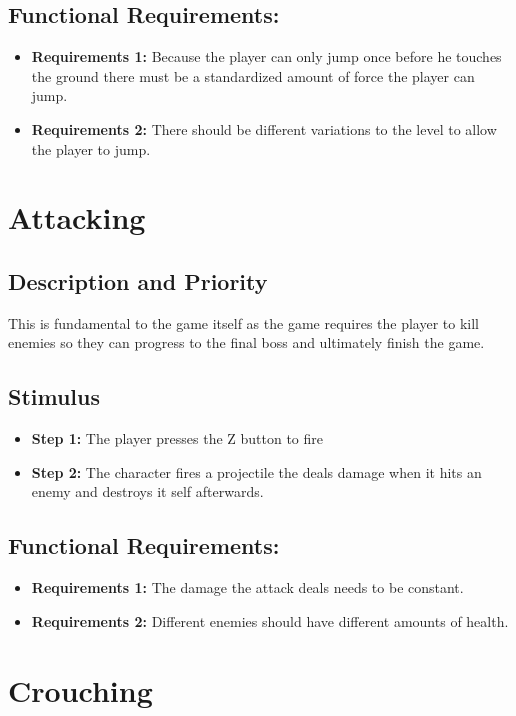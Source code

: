 \subsection{Functional Requirements:}
\begin{itemize}
    \item \textbf{Requirements 1:} Because the player can only jump once before he touches the ground there must be a standardized amount of force the player can jump.
    \item \textbf{Requirements 2:} There should be different variations to the level to allow the player to jump.
\end{itemize}

\section{Attacking}
\subsection{Description and Priority}
This is fundamental to the game itself as the game requires the player to kill enemies so they can progress to the final boss and ultimately finish the game.
\subsection{Stimulus}
\begin{itemize}
    \item \textbf{Step 1:} The player presses the Z button to fire
    \item \textbf{Step 2:} The character fires a projectile the deals damage when it hits an enemy and destroys it self afterwards.
\end{itemize}
\subsection{Functional Requirements:}
\begin{itemize}
    \item \textbf{Requirements 1:} The damage the attack deals needs to be constant.
    \item \textbf{Requirements 2:} Different enemies should have different amounts of health.
\end{itemize}

\section{Crouching}
